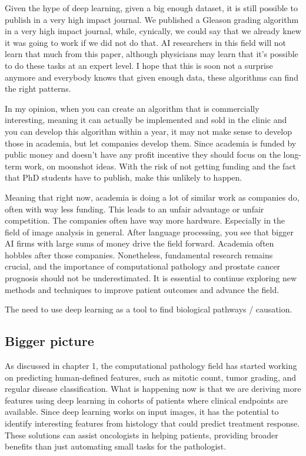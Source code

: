 \documentclass[
  12pt,
  a5,margin=2cmpaper,
]{article}
\begin{document}
Given the hype of deep learning, given a big enough dataset, it is still
possible to publish in a very high impact journal. We published a
Gleason grading algorithm in a very high impact journal, while,
cynically, we could say that we already knew it was going to work if we
did not do that. AI researchers in this field will not learn that much
from this paper, although physicians may learn that it's possible to do
these tasks at an expert level. I hope that this is soon not a surprise
anymore and everybody knows that given enough data, these algorithms can
find the right patterns.

In my opinion, when you can create an algorithm that is commercially
interesting, meaning it can actually be implemented and sold in the
clinic and you can develop this algorithm within a year, it may not make
sense to develop those in academia, but let companies develop them.
Since academia is funded by public money and doesn't have any profit
incentive they should focus on the long-term work, on moonshot ideas.
With the risk of not getting funding and the fact that PhD students have
to publish, make this unlikely to happen.

Meaning that right now, academia is doing a lot of similar work as
companies do, often with way less funding. This leads to an unfair
advantage or unfair competition. The companies often have way more
hardware. Especially in the field of image analysis in general. After
language processing, you see that bigger AI firms with large sums of
money drive the field forward. Academia often hobbles after those
companies. Nonetheless, fundamental research remains crucial, and the
importance of computational pathology and prostate cancer prognosis
should not be underestimated. It is essential to continue exploring new
methods and techniques to improve patient outcomes and advance the
field.

The need to use deep learning as a tool to find biological pathways /
causation.

\hypertarget{bigger-picture}{%
\subsection{Bigger picture}\label{bigger-picture}}

As discussed in chapter 1, the computational pathology field has started
working on predicting human-defined features, such as mitotic count,
tumor grading, and regular disease classification. What is happening now
is that we are deriving more features using deep learning in cohorts of
patients where clinical endpoints are available. Since deep learning
works on input images, it has the potential to identify interesting
features from histology that could predict treatment response. These
solutions can assist oncologists in helping patients, providing broader
benefits than just automating small tasks for the pathologist.
\end{document}
